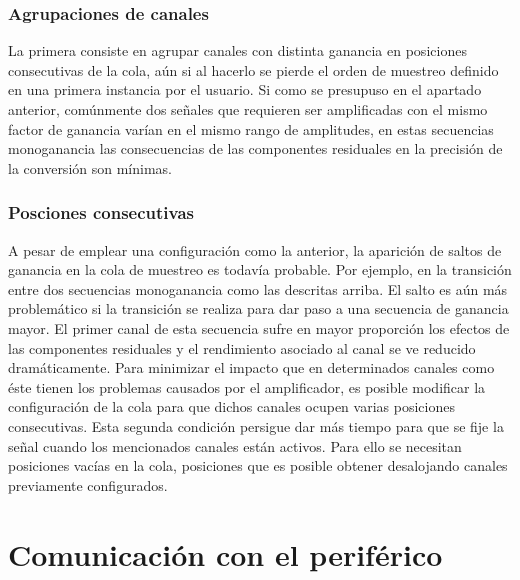 \subsubsection{Agrupaciones de canales}

La primera consiste en agrupar canales con distinta ganancia en posiciones consecutivas de la cola, aún si al hacerlo se pierde el orden de muestreo definido en una primera instancia por el usuario. Si como se presupuso en el apartado anterior, comúnmente dos señales que requieren ser amplificadas con el mismo factor de ganancia varían en el mismo rango de amplitudes, en estas secuencias monoganancia las consecuencias de las componentes residuales en la precisión de la conversión son mínimas.


\subsubsection{Posciones consecutivas}

A pesar de emplear una configuración como la anterior, la aparición de saltos de ganancia en la cola de muestreo es todavía probable. Por ejemplo, en la transición entre dos secuencias monoganancia como las descritas arriba. El salto es aún más problemático si la transición se realiza para dar paso a una secuencia de ganancia mayor. El primer canal de esta secuencia sufre en mayor proporción los efectos de las componentes residuales y el rendimiento asociado al canal se ve reducido dramáticamente. Para minimizar el impacto que en determinados canales como éste tienen los problemas causados por el amplificador, es posible modificar la configuración de la cola para que dichos canales ocupen varias posiciones consecutivas. Esta segunda condición persigue dar más tiempo para que se fije la señal cuando los mencionados canales están activos. Para ello se necesitan posiciones vacías en la cola, posiciones que es posible obtener desalojando canales previamente configurados.


\section{Comunicación con el periférico}


